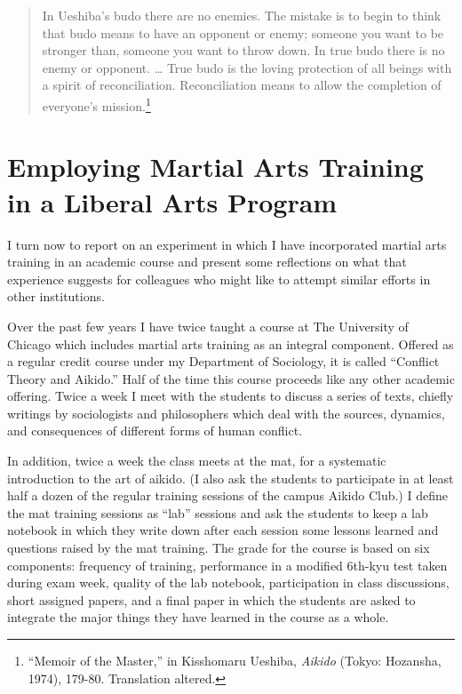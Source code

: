 \begin{quote}
In Ueshiba's budo there are no enemies. The mistake is to begin to think that budo means to have an opponent or enemy; someone you want to be stronger than, someone you want to throw down. In true budo there is no enemy or opponent. \ldots{} True budo is the loving protection of all beings with a spirit of reconciliation. Reconciliation means to allow the completion of everyone's mission.\footnote{``Memoir of the Master,'' in Kisshomaru Ueshiba, \emph{Aikido} (Tokyo: Hozansha, 1974), 179-80. Translation altered.}
\end{quote}

\section*{Employing Martial Arts Training in a Liberal Arts Program}

I turn now to report on an experiment in which I have incorporated martial arts training in an academic course and present some reflections on what that experience suggests for colleagues who might like to attempt similar efforts in other institutions.

Over the past few years I have twice taught a course at The University of Chicago which includes martial arts training as an integral component. Offered as a regular credit course under my Department of Sociology, it is called ``Conflict Theory and Aikido.'' Half of the time this course proceeds like any other academic offering. Twice a week I meet with the students to discuss a series of texts, chiefly writings by sociologists and philosophers which deal with the sources, dynamics, and consequences of different forms of human conflict. 

In addition, twice a week the class meets at the mat, for a systematic introduction to the art of aikido. (I also ask the students to participate in at least half a dozen of the regular training sessions of the campus Aikido Club.) I define the mat training sessions as ``lab'' sessions and ask the students to keep a lab notebook in which they write down after each session some lessons learned and questions raised by the mat training. The grade for the course is based on six components: frequency of training, performance in a modified 6th-kyu test taken during exam week, quality of the lab notebook, participation in class discussions, short assigned papers, and a final paper in which the students are asked to integrate the major things they have learned in the course as a whole. 

